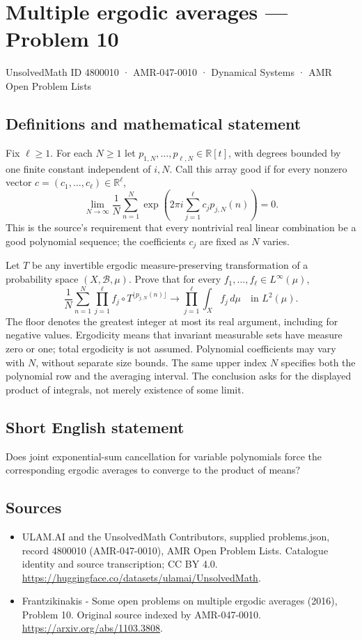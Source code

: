 \documentclass[11pt,a4paper]{article}
\begin{document}
\section*{Multiple ergodic averages — Problem 10}\label{4800010}
{\small UnsolvedMath ID 4800010 · AMR-047-0010 · Dynamical Systems · AMR Open Problem Lists}
\subsection{Definitions and mathematical statement}
Fix $\ell\ge1$. For each $N\ge1$ let
$p_{1,N},\ldots,p_{\ell,N}\in\mathbb R[t]$, with degrees
bounded by one finite constant independent of $i,N$.
Call this array good if for every nonzero vector
$c=(c_1,\ldots,c_\ell)\in\mathbb R^\ell$,
\[
       \lim_{N\to\infty}\frac1N\sum_{n=1}^N
           \exp\!\left(2\pi i\sum_{j=1}^\ell
                                   c_jp_{j,N}(n)\right)=0.
\]
This is the source's requirement that every nontrivial
real linear combination be a good polynomial sequence;
the coefficients $c_j$ are fixed as $N$ varies.

Let $T$ be any invertible ergodic measure-preserving
transformation of a probability space $(X,\mathcal B,\mu)$.
Prove that for every $f_1,\ldots,f_\ell\in L^\infty(\mu)$,
\[
 \frac1N\sum_{n=1}^N\prod_{j=1}^\ell
       f_j\circ T^{\lfloor p_{j,N}(n)\rfloor}
       \longrightarrow\prod_{j=1}^\ell\int_X f_j\,d\mu
                        \quad\text{in }L^2(\mu).
\]
The floor denotes the greatest integer at most its real
argument, including for negative values. Ergodicity means
that invariant measurable sets have measure zero or one;
total ergodicity is not assumed. Polynomial coefficients
may vary with $N$, without separate size bounds. The
same upper index $N$ specifies both the polynomial row
and the averaging interval. The conclusion asks for the
displayed product of integrals, not merely existence of
some limit.
\subsection{Short English statement}
Does joint exponential-sum cancellation for variable polynomials force the corresponding ergodic averages to converge to the product of means?
\subsection{Sources}
\begin{itemize}
\item[S1] ULAM.AI and the UnsolvedMath Contributors, supplied problems.json, record 4800010 (AMR-047-0010), AMR Open Problem Lists. Catalogue identity and source transcription; CC BY 4.0.
\url{https://huggingface.co/datasets/ulamai/UnsolvedMath}.
\item[S2] Frantzikinakis - Some open problems on multiple ergodic averages (2016), Problem 10. Original source indexed by AMR-047-0010.
\url{https://arxiv.org/abs/1103.3808}.
\end{itemize}
\end{document}
